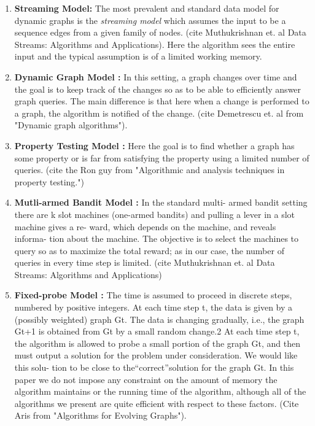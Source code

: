 \begin{enumerate}
	\item {\textbf{Streaming Model: }} The most prevalent and standard data model for dynamic graphs is the \emph{streaming model} which assumes the input to be a sequence edges from a given family of nodes. (cite Muthukrishnan et. al Data Streams: Algorithms and Applications). Here the algorithm sees the entire input and the typical assumption is of a limited working memory. 

	
	
	\item {\textbf{Dynamic Graph Model :}} In this setting, a graph changes over time and the goal is to keep track of the changes so as to be able to efficiently answer graph queries. The main difference is that here when a change is performed to a graph, the algorithm is notified of the change. (cite Demetrescu et. al from "Dynamic graph algorithms").


	\item {\textbf{Property Testing Model :}}  Here the goal is to find whether a graph has some property or is far from satisfying the property using a limited number of queries. (cite the Ron guy from "Algorithmic and analysis techniques in property testing.")

	\item {\textbf{Mutli-armed Bandit Model :}}  In the standard multi- armed bandit setting there are k slot machines (one-armed bandits) and pulling a lever in a slot machine gives a re- ward, which depends on the machine, and reveals informa- tion about the machine. The objective is to select the machines to query so as to maximize the total reward; as in our case, the number of queries in every time step is limited. (cite Muthukrishnan et. al Data Streams: Algorithms and Applications)

	\item {\textbf{Fixed-probe Model :}} The time is assumed to proceed in discrete steps, numbered by positive integers. At each time step t, the data is given by a (possibly weighted) graph Gt. The data is changing gradually, i.e., the graph Gt+1 is obtained from Gt by a small random change.2 At each time step t, the algorithm is allowed to probe a small portion of the graph Gt, and then must output a solution for the problem under consideration. We would like this solu- tion to be close to the“correct”solution for the graph Gt. In this paper we do not impose any constraint on the amount of memory the algorithm maintains or the running time of the algorithm, although all of the algorithms we present are quite efficient with respect to these factors. (Cite Aris from "Algorithms for Evolving Graphs").


\end{enumerate}
